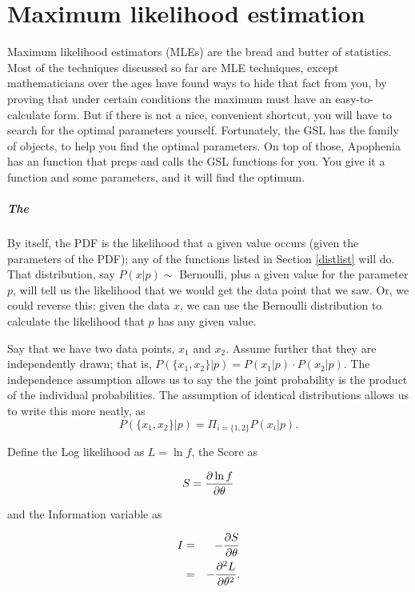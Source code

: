 \chapter{Maximum likelihood estimation} \label{mle}

Maximum likelihood estimators (MLEs) are the bread and butter of
statistics. Most of the techniques discussed so far are MLE
techniques, except mathematicians over the ages have found ways to hide
that fact from you, by proving that under certain conditions the
maximum must have an easy-to-calculate form. But if there is not a nice,
convenient shortcut, you will have to 
search for the optimal parameters yourself. Fortunately, the GSL has the  family
of objects, to help you find the optimal parameters. On top of those,
Apophenia has an  function that
preps and calls the GSL functions for you. You give it a function and
some parameters, and it will find the optimum.

\paragraph{The }	\label{the score}
By itself, the PDF is the likelihood that a given value occurs (given
the parameters of the PDF); any of the functions listed in Section
\ref{distlist} will do. That distribution, say $P(x|p)\sim$ Bernoulli,
plus a given value for the parameter $p$, will tell us the likelihood
that we would get the data point that we saw. Or, we could reverse this:
given the data $x$, we can use the Bernoulli distribution to calculate the
likelihood that $p$ has any given value.

Say that we have two data points, $x_1$ and $x_2$. Assume further that
they are independently drawn; that is, $P(\{x_1,x_2\}|p)=P(x_1|p)\cdot P(x_2|p)$. 
The independence assumption allows us to say the the joint probability
is the product of the individual probabilities. The assumption of
identical distributions allows us to write this more neatly, as 
$$P(\{x_1,x_2\}|p)=\Pi_{i=\{1,2\}}P(x_i|p).$$

Define the Log likelihood as $L=\ln f$, the Score as

$$S={\partial \ln f\over \partial \theta}$$ 

and the Information variable as

\begin{eqnarray}
I&=&-{\partial S \over \partial \theta}			\nonumber\\
&=&-{\partial^2 L \over \partial \theta^2}.		\nonumber
\end{eqnarray}

